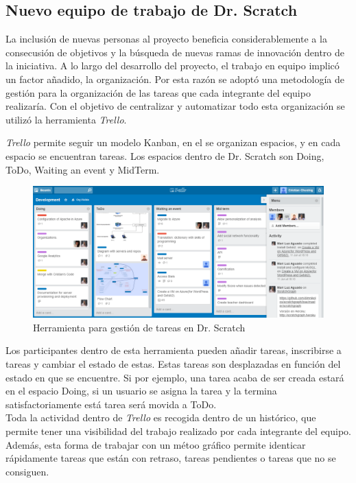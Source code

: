 \documentclass[a4paper, 12pt]{book}
\begin{document}
\subsection{Nuevo equipo de trabajo de Dr. Scratch}

La inclusión de nuevas personas al proyecto beneficia considerablemente a la 
consecusión de objetivos y la búsqueda de nuevas ramas de innovación dentro de la
iniciativa. A lo largo del desarrollo del proyecto, el trabajo en equipo implicó
un factor añadido, la organización. Por esta razón se adoptó una metodología de 
gestión para la organización de las tareas que cada integrante del equipo realizaría. 
Con el objetivo de centralizar y automatizar todo esta organización se utilizó
la herramienta \emph{Trello}.  

\emph{Trello} permite seguir un modelo Kanban, en el se organizan espacios, y en
cada espacio se encuentran tareas. Los espacios dentro de Dr. Scratch son Doing, ToDo,
Waiting an event y MidTerm.

\begin{figure}
	\graphicspath{{img/}}
  \includegraphics[bb=0 0 800 600, width=12cm, keepaspectratio]{trello.png}
	\caption{Herramienta para gestión de tareas en Dr. Scratch}
  \label{figura:foro_hilos}
\end{figure}


Los participantes dentro de esta herramienta pueden añadir tareas, inscribirse
a tareas y cambiar el estado de estas. Estas tareas son desplazadas en función
del estado en que se encuentre. Si por ejemplo, una tarea acaba de ser creada
estará en el espacio Doing, si un usuario se asigna la tarea y la termina 
satisfactoriamente está tarea será movida a ToDo. \\

Toda la actividad dentro de \emph{Trello} es recogida dentro de un histórico,
que permite tener una visibilidad del trabajo realizado por cada integrante del
equipo. Además, esta forma de trabajar con un métoo gráfico permite identicar
rápidamente tareas que están con retraso, tareas pendientes o tareas que no
se consiguen. \\
\end{document}
